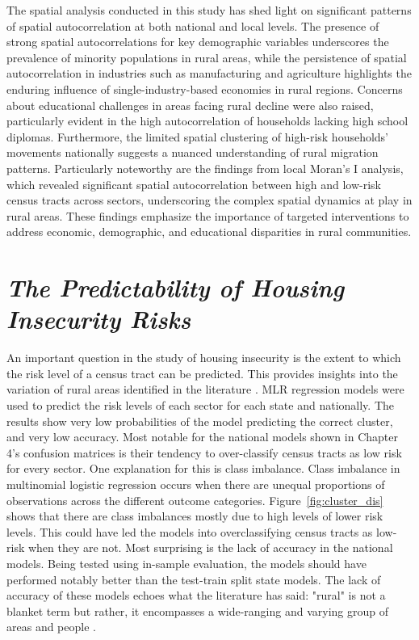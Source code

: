 The spatial analysis conducted in this study has shed light on significant patterns of spatial autocorrelation at both national and local levels. The presence of strong spatial autocorrelations for key demographic variables underscores the prevalence of minority populations in rural areas, while the persistence of spatial autocorrelation in industries such as manufacturing and agriculture highlights the enduring influence of single-industry-based economies in rural regions. Concerns about educational challenges in areas facing rural decline were also raised, particularly evident in the high autocorrelation of households lacking high school diplomas. Furthermore, the limited spatial clustering of high-risk households' movements nationally suggests a nuanced understanding of rural migration patterns. Particularly noteworthy are the findings from local Moran's I analysis, which revealed significant spatial autocorrelation between high and low-risk census tracts across sectors, underscoring the complex spatial dynamics at play in rural areas. These findings emphasize the importance of targeted interventions to address economic, demographic, and educational disparities in rural communities.


\section{\textit{The Predictability of Housing Insecurity Risks}}

An important question in the study of housing insecurity is the extent to which the risk level of a census tract can be predicted. This provides insights into the variation of rural areas identified in the literature \citep{cromartie_defining_2008}. MLR regression models were used to predict the risk levels of each sector for each state and nationally. The results show very low probabilities of the model predicting the correct cluster, and very low accuracy. Most notable for the national models shown in Chapter 4's confusion matrices is their tendency to over-classify census tracts as low risk for every sector. One explanation for this is class imbalance. Class imbalance in multinomial logistic regression occurs when there are unequal proportions of observations across the different outcome categories. Figure~\ref{fig:cluster_dis} shows that there are class imbalances mostly due to high levels of lower risk levels. This could have led the models into overclassifying census tracts as low-risk when they are not. Most surprising is the lack of accuracy in the national models. Being tested using in-sample evaluation, the models should have performed notably better than the test-train split state models. The lack of accuracy of these models echoes what the literature has said: "rural" is not a blanket term but rather, it encompasses a wide-ranging and varying group of areas and people \citep{cromartie_defining_2008}. 

